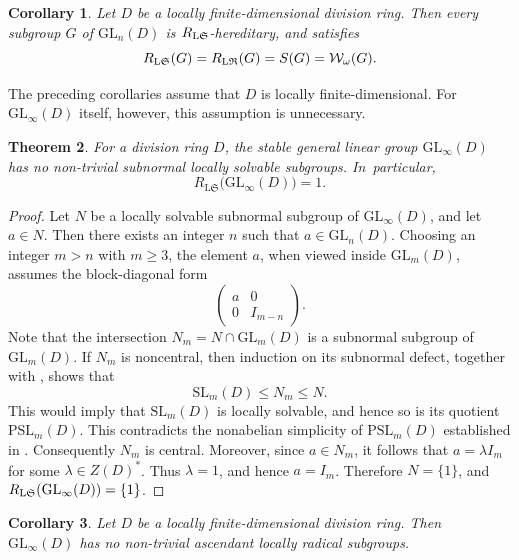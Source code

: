 \documentclass[11pt, reqno]{amsart}
\numberwithin{equation}{section}
\newtheorem{theorem}{Theorem}[section]
\newtheorem{corollary}[theorem]{Corollary}
\theoremstyle{definition}
\numberwithin{equation}{section}
\begin{document}
\begin{corollary} \label{cor:gl_n_locfin}
Let $D$ be a locally finite-dimensional division ring. Then every subgroup $G$ of $\mathrm{GL}_n(D)$ is $R_{\textup{L}\mathfrak{S}}$-hereditary, and satisfies 
$$ R_{\textup{L}\mathfrak{S}}(G) = R_{\textup{L}\mathfrak{R}}(G) = S(G) = \mathcal{W}_{\omega}(G). $$
\end{corollary}

The preceding corollaries assume that $D$ is locally finite-dimensional. For $\mathrm{GL}_{\infty}(D)$ itself, however, this assumption is unnecessary.

\begin{theorem} \label{theo:locsolradofstableistri} For a division ring $D$, the stable general linear group $\mathrm{GL}_\infty(D)$ has no non-trivial subnormal locally solvable subgroups. In~particular, $$R_{\mathrm{L}\mathfrak S}\bigl(\mathrm{GL}_\infty(D)\bigr)=1.$$ 
\end{theorem}

\begin{proof}
Let $N$ be a locally solvable subnormal subgroup of $\mathrm{GL}_\infty(D)$, and let $a \in N$. Then there exists an integer $n$ 
such that $a \in \mathrm{GL}_n(D)$. Choosing an integer $m > n$ with $m \geq 3$, 
the element $a$, when viewed inside $\mathrm{GL}_m(D)$, assumes the block-diagonal form
$$\begin{pmatrix} 
  a & 0 \\ 0 & I_{m-n} 
\end{pmatrix}. $$
Note that the intersection
$N_m = N \cap \mathrm{GL}_m(D)$
is a subnormal subgroup of $\mathrm{GL}_m(D)$. If $N_m$ is noncentral, then induction on its subnormal defect, together
with \cite[Theorem~II.10.1]{Suprunenko}, shows that
$$\mathrm{SL}_m(D)\leq N_m\leq N.$$ 
This would imply that $\mathrm{SL}_m(D)$ is locally  solvable, and hence so is its quotient $\mathrm{PSL}_m(D)$. This contradicts the nonabelian simplicity of $\mathrm{PSL}_m(D)$ established in \cite[Theorem~II.10.4]{Suprunenko}.  Consequently $N_m$ is central. Moreover, since $a \in N_m$, it follows that  $a = \lambda I_m$ for some $\lambda \in Z(D)^*$. Thus $\lambda = 1$, and hence $a = I_m$. Therefore $N = \{1\}$, and $R_{\textup{L}\mathfrak{S}}(\mathrm{GL}_\infty(D)) = \{1\}$.
\end{proof}

\begin{corollary} \label{cor:ascendant_trivial} 
    Let $D$ be a locally finite-dimensional division ring. Then $\mathrm{GL}_\infty(D)$ has no non-trivial ascendant locally radical subgroups. 
\end{corollary}
\end{document}

